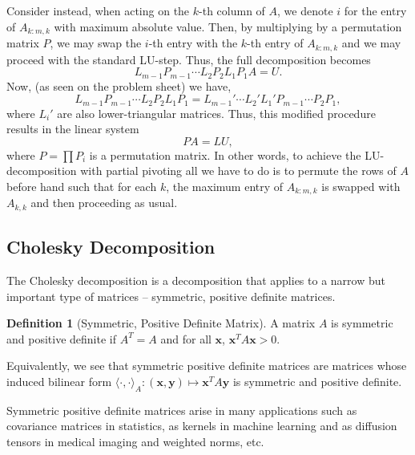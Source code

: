 \documentclass[
]{article}
\theoremstyle{definition}
\theoremstyle{definition}
\newtheorem{definition}{Definition}[section]
\begin{document}
Consider instead, when acting on the \(k\)-th column of \(A\), we denote
\(i\) for the entry of \(A_{k:m, k}\) with maximum absolute value. Then,
by multiplying by a permutation matrix \(P\), we may swap the \(i\)-th
entry with the \(k\)-th entry of \(A_{k:m, k}\) and we may proceed with
the standard LU-step. Thus, the full decomposition becomes
\[L_{m - 1}P_{m -1} \cdots L_2 P_2 L_1 P_1 A = U.\] Now, (as seen on the
problem sheet) we have, \[L_{m - 1}P_{m -1} \cdots L_2 P_2 L_1 P_1 
  = L_{m - 1}' \cdots L_2' L_1' P_{m - 1} \cdots P_2 P_1,\] where
\(L_i'\) are also lower-triangular matrices. Thus, this modified
procedure results in the linear system \[PA = LU,\] where
\(P = \prod P_i\) is a permutation matrix. In other words, to achieve
the LU-decomposition with partial pivoting all we have to do is to
permute the rows of \(A\) before hand such that for each \(k\), the
maximum entry of \(A_{k:m, k}\) is swapped with \(A_{k, k}\) and then
proceeding as usual.

\hypertarget{cholesky-decomposition}{%
\subsection{Cholesky Decomposition}\label{cholesky-decomposition}}

The Cholesky decomposition is a decomposition that applies to a narrow
but important type of matrices -- symmetric, positive definite matrices.

\begin{definition}[Symmetric, Positive Definite Matrix]
  A matrix \(A\) is symmetric and positive definite if \(A^T = A\) and 
  for all \(\mathbf{x}\), \(\mathbf{x}^T A\mathbf{x} > 0\).
\end{definition}

Equivalently, we see that symmetric positive definite matrices are
matrices whose induced bilinear form
\(\langle \cdot, \cdot \rangle_A :  (\mathbf{x}, \mathbf{y}) \mapsto \mathbf{x}^T A\mathbf{y}\)
is symmetric and positive definite.

Symmetric positive definite matrices arise in many applications such as
covariance matrices in statistics, as kernels in machine learning and as
diffusion tensors in medical imaging and weighted norms, etc.
\end{document}
